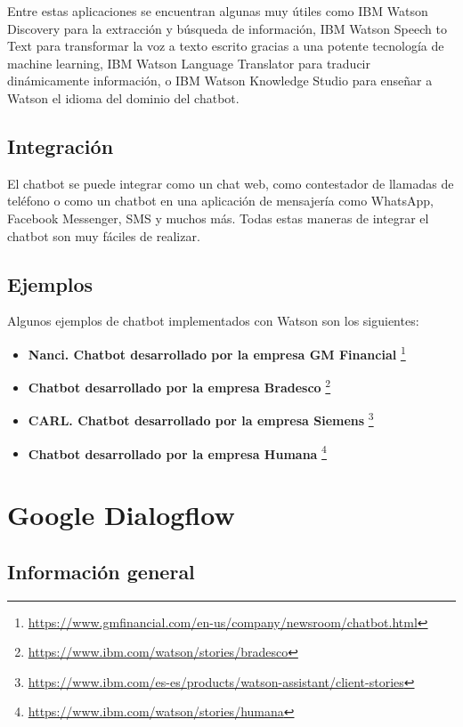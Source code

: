 Entre estas aplicaciones se encuentran algunas muy útiles como IBM Watson Discovery para la extracción y búsqueda de información, IBM Watson Speech to Text para transformar la voz a texto escrito gracias a una potente tecnología de machine learning, IBM Watson Language Translator para traducir dinámicamente información, o IBM Watson Knowledge Studio para enseñar a Watson el idioma del dominio del chatbot.

\subsection*{Integración}

El chatbot se puede integrar como un chat web, como contestador de llamadas de teléfono o como un chatbot en una aplicación de mensajería como WhatsApp, Facebook Messenger, SMS y muchos más. Todas estas maneras de integrar el chatbot son muy fáciles de realizar.

\subsection*{Ejemplos}

Algunos ejemplos de chatbot implementados con Watson son los siguientes:

\begin{itemize}
\item \textbf{Nanci. Chatbot desarrollado por la empresa GM Financial} \footnote{\url{https://www.gmfinancial.com/en-us/company/newsroom/chatbot.html}}
\item \textbf{Chatbot desarrollado por la empresa Bradesco} \footnote{\url{https://www.ibm.com/watson/stories/bradesco}}
\item \textbf{CARL. Chatbot desarrollado por la empresa Siemens} \footnote{\url{https://www.ibm.com/es-es/products/watson-assistant/client-stories}}
\item \textbf{Chatbot desarrollado por la empresa Humana} \footnote{\url{https://www.ibm.com/watson/stories/humana}}
\end{itemize}


\section{Google Dialogflow}\label{subsec:dialogflow}

\subsection*{Información general}

